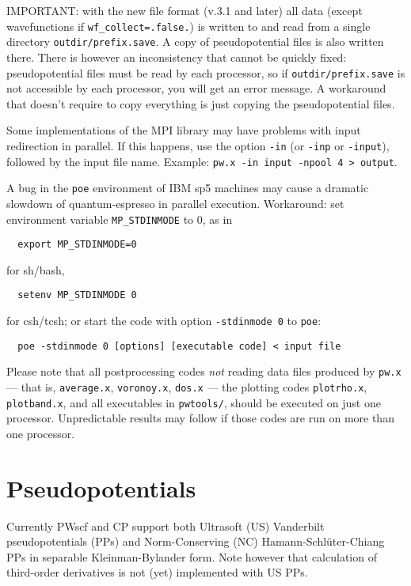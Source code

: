 \documentclass[12pt,a4paper]{article}
\begin{document}
IMPORTANT: with the new file format (v.3.1 and later) all data 
(except wavefunctions if \texttt{wf\_collect=.false.}) is written
to and read from a single directory \texttt{outdir/prefix.save}. 
A copy of pseudopotential files is also written there. There is 
however an inconsistency that cannot be quickly fixed: pseudopotential 
files must be read by each processor, so if \texttt{outdir/prefix.save}
is not accessible by each processor, you will get an error message.
A workaround that doesn't require to copy everything is just copying
the pseudopotential files.

Some implementations of the MPI library may have problems with
input redirection in parallel.
If this happens, use the option \texttt{-in} (or \texttt{-inp} or
\texttt{-input}), followed by the input file name.
Example: \texttt{pw.x -in input -npool 4 > output}.

A bug in the \texttt{poe} environment of IBM sp5 machines
may cause a dramatic slowdown of quantum-espresso in parallel 
execution. Workaround: set environment variable 
\texttt{MP\_STDINMODE} to 0, as in
\begin{verbatim}
  export MP_STDINMODE=0
\end{verbatim}
for sh/bash,
\begin{verbatim}
  setenv MP_STDINMODE 0
\end{verbatim}
for csh/tcsh; or start the code with option \texttt{-stdinmode 0} to 
\texttt{poe}:
\begin{verbatim}
  poe -stdinmode 0 [options] [executable code] < input file
\end{verbatim}

Please note that all postprocessing codes \emph{not} reading data
files produced by \texttt{pw.x} --- that is,
\texttt{average.x}, \texttt{voronoy.x}, \texttt{dos.x} --- the
plotting codes \texttt{plotrho.x}, \texttt{plotband.x}, and all
executables in \texttt{pwtools/}, should be executed on just one
processor.
Unpredictable results may follow if those codes are run on more than
one processor.

\clearpage

\section{Pseudopotentials}
  \label{pseudopotentials}

Currently PWscf and CP support both Ultrasoft (US) Vanderbilt
pseudopotentials (PPs) and Norm-Conserving (NC)
Hamann-Schl\"uter-Chiang PPs in separable Kleinman-Bylander form.
Note however that calculation of third-order derivatives is not (yet)
implemented with US PPs. 
\end{document}

